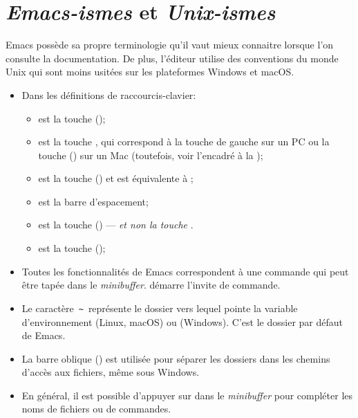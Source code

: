 \section{\emph{Emacs-ismes} et \emph{Unix-ismes}}
\label{sec:emacs+ess:ismes}

Emacs possède sa propre terminologie qu'il vaut mieux connaitre
lorsque l'on consulte la documentation. De plus, l'éditeur utilise des
conventions du monde Unix qui sont moins usitées sur les plateformes
Windows et macOS.

\begin{itemize}
\item Dans les définitions de raccourcis-clavier:
  \begin{itemize}
  \item {} est la touche  (\ctlkey);
  \item {} est la touche , qui correspond à la touche
     de gauche sur un PC ou la touche 
    (\optkey) sur un Mac (toutefois, voir l'encadré à la
    );
  \item {} est la touche  (\esckey) et
    est équivalente à ;
  \item {} est la barre d'espacement;
  \item {} est la touche  (\delkey) ---
    \emph{et non la touche} .
  \item {} est la touche  (\returnkey);
  \end{itemize}
\item Toutes les fonctionnalités de Emacs correspondent à une commande
  qui peut être tapée dans le \emph{minibuffer}.  démarre
  l'invite de commande.
\item Le caractère \,\verb=~=\, représente le dossier vers lequel
  pointe la variable d'environnement  (Linux, macOS) ou
   (Windows). C'est le dossier par défaut de Emacs.
\item La barre oblique (\code{/}) est utilisée pour séparer les
  dossiers dans les chemins d'accès aux fichiers, même sous Windows.
\item En général, il est possible d'appuyer sur  dans le
  \emph{minibuffer} pour compléter les noms de fichiers ou de
  commandes.
\end{itemize}

